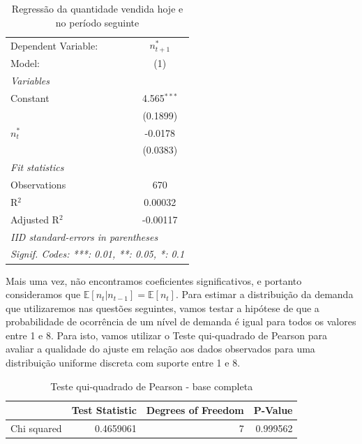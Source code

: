 \documentclass{article}
\begin{document}
\begin{table}[H]
\begingroup
\centering
\begin{tabular}{lc}
   \tabularnewline \midrule \midrule
   Dependent Variable: & $n^*_{t+1}$\\   
   Model:              & (1)\\  
   \midrule
   \emph{Variables}\\
   Constant            & 4.565$^{***}$\\   
                       & (0.1899)\\   
   $n^*_t$                & -0.0178\\   
                       & (0.0383)\\   
   \midrule
   \emph{Fit statistics}\\
   Observations        & 670\\  
   R$^2$               & 0.00032\\  
   Adjusted R$^2$      & -0.00117\\  
   \midrule \midrule
   \multicolumn{2}{l}{\emph{IID standard-errors in parentheses}}\\
   \multicolumn{2}{l}{\emph{Signif. Codes: ***: 0.01, **: 0.05, *: 0.1}}\\
\end{tabular}
\par\endgroup
    \caption{Regressão da quantidade vendida hoje e no período seguinte}
    \label{tab:my_label}
\end{table}

Mais uma vez, não encontramos coeficientes significativos, e portanto consideramos que $\mathbb{E}[n_t | n_{t-1}] = \mathbb{E}[n_t]$. Para estimar a distribuição da demanda que utilizaremos nas questões seguintes, vamos testar a hipótese de que a probabilidade de ocorrência de um nível de demanda é igual para todos os valores entre 1 e 8. Para isto, vamos utilizar o Teste qui-quadrado de Pearson para avaliar a qualidade do ajuste em relação aos dados observados para uma distribuição uniforme discreta com suporte entre 1 e 8.

\begin{table}[H]
    \centering
\begin{tabular}{l|r|r|r}
\hline
  & Test Statistic & Degrees of Freedom & P-Value\\
\hline
Chi squared & 0.4659061 & 7 & 0.999562\\
\hline
\end{tabular}
    \caption{Teste qui-quadrado de Pearson - base completa}
    \label{tab:my_label}
\end{table}
\end{document}
